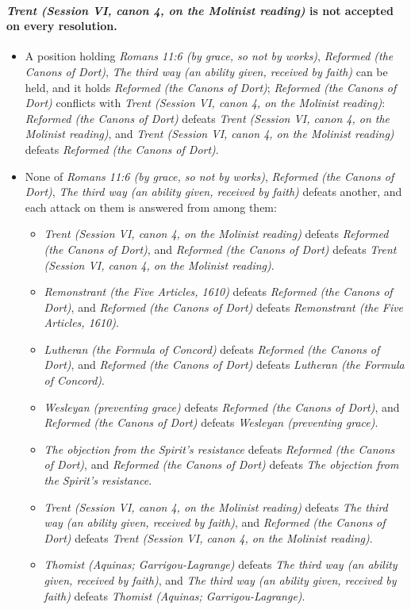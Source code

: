 \documentclass[11pt]{article}
\begin{document}
\paragraph{\emph{Trent (Session VI, canon 4, on the Molinist reading)} is not accepted on every resolution.}
\begin{itemize}
\item A position holding \emph{Romans 11:6 (by grace, so not by works)}, \emph{Reformed (the Canons of Dort)}, \emph{The third way (an ability given, received by faith)} can be held, and it holds \emph{Reformed (the Canons of Dort)}; \emph{Reformed (the Canons of Dort)} conflicts with \emph{Trent (Session VI, canon 4, on the Molinist reading)}: \emph{Reformed (the Canons of Dort)} defeats \emph{Trent (Session VI, canon 4, on the Molinist reading)}, and \emph{Trent (Session VI, canon 4, on the Molinist reading)} defeats \emph{Reformed (the Canons of Dort)}.
\item None of \emph{Romans 11:6 (by grace, so not by works)}, \emph{Reformed (the Canons of Dort)}, \emph{The third way (an ability given, received by faith)} defeats another, and each attack on them is answered from among them:
\begin{itemize}
\item \emph{Trent (Session VI, canon 4, on the Molinist reading)} defeats \emph{Reformed (the Canons of Dort)}, and \emph{Reformed (the Canons of Dort)} defeats \emph{Trent (Session VI, canon 4, on the Molinist reading)}.
\item \emph{Remonstrant (the Five Articles, 1610)} defeats \emph{Reformed (the Canons of Dort)}, and \emph{Reformed (the Canons of Dort)} defeats \emph{Remonstrant (the Five Articles, 1610)}.
\item \emph{Lutheran (the Formula of Concord)} defeats \emph{Reformed (the Canons of Dort)}, and \emph{Reformed (the Canons of Dort)} defeats \emph{Lutheran (the Formula of Concord)}.
\item \emph{Wesleyan (preventing grace)} defeats \emph{Reformed (the Canons of Dort)}, and \emph{Reformed (the Canons of Dort)} defeats \emph{Wesleyan (preventing grace)}.
\item \emph{The objection from the Spirit’s resistance} defeats \emph{Reformed (the Canons of Dort)}, and \emph{Reformed (the Canons of Dort)} defeats \emph{The objection from the Spirit’s resistance}.
\item \emph{Trent (Session VI, canon 4, on the Molinist reading)} defeats \emph{The third way (an ability given, received by faith)}, and \emph{Reformed (the Canons of Dort)} defeats \emph{Trent (Session VI, canon 4, on the Molinist reading)}.
\item \emph{Thomist (Aquinas; Garrigou-Lagrange)} defeats \emph{The third way (an ability given, received by faith)}, and \emph{The third way (an ability given, received by faith)} defeats \emph{Thomist (Aquinas; Garrigou-Lagrange)}.
\end{itemize}
\end{itemize}
\end{document}
